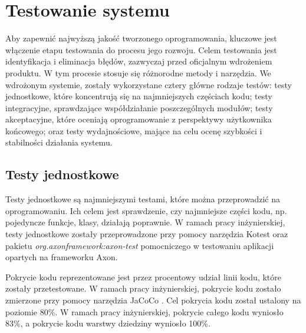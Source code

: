 \clearpage %

\section{Testowanie systemu}

Aby zapewnić najwyższą jakość tworzonego oprogramowania, kluczowe jest włączenie etapu testowania do procesu jego rozwoju. Celem testowania jest identyfikacja i eliminacja błędów, zazwyczaj przed oficjalnym wdrożeniem produktu. W tym procesie stosuje się różnorodne metody i narzędzia. We wdrożonym systemie, zostały wykorzystane cztery główne rodzaje testów: testy jednostkowe, które koncentrują się na najmniejszych częściach kodu; testy integracyjne, sprawdzające współdziałanie poszczególnych modułów; testy akceptacyjne, które oceniają oprogramowanie z perspektywy użytkownika końcowego; oraz testy wydajnościowe, mające na celu ocenę szybkości i stabilności działania systemu.

\subsection{Testy jednostkowe}

Testy jednostkowe są najmniejszymi testami, które można przeprowadzić na oprogramowaniu. Ich celem jest sprawdzenie, czy najmniejsze części kodu, np. pojedyncze funkcje, klasy, działają poprawnie. W ramach pracy inżynierskiej, testy jednostkowe zostały przeprowadzone przy pomocy narzędzia Kotest \cite{kotest} oraz pakietu \textit{org.axonframework:axon-test} pomocniczego w testowaniu aplikacji opartych na frameworku Axon.

Pokrycie kodu reprezentowane jest przez procentowy udział linii kodu, które zostały przetestowane. W ramach pracy inżynierskiej, pokrycie kodu zostało zmierzone przy pomocy narzędzia JaCoCo \cite{jacoco}. Cel pokrycia kodu został ustalony na poziomie 80\%. W ramach pracy inżynierskiej, pokrycie całego kodu wyniosło 83\%, a pokrycie kodu warstwy dziedziny wyniosło 100\%.

